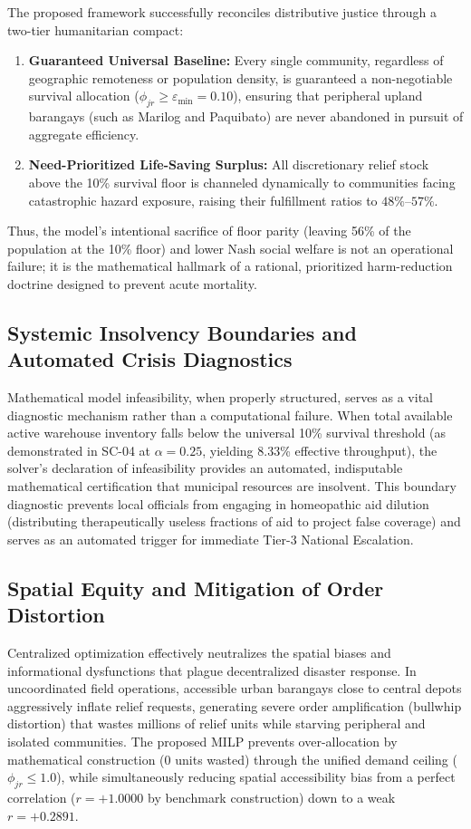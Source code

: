 The proposed framework successfully reconciles distributive justice through a two-tier humanitarian compact:
\begin{enumerate}
    \item \textbf{Guaranteed Universal Baseline:} Every single community, regardless of geographic remoteness or population density, is guaranteed a non-negotiable survival allocation ($\phi_{jr} \ge \varepsilon_{\min} = 0.10$), ensuring that peripheral upland barangays (such as Marilog and Paquibato) are never abandoned in pursuit of aggregate efficiency.
    \item \textbf{Need-Prioritized Life-Saving Surplus:} All discretionary relief stock above the 10\% survival floor is channeled dynamically to communities facing catastrophic hazard exposure, raising their fulfillment ratios to $48\%$--$57\%$.
\end{enumerate}
Thus, the model's intentional sacrifice of floor parity (leaving 56\% of the population at the 10\% floor) and lower Nash social welfare is not an operational failure; it is the mathematical hallmark of a rational, prioritized harm-reduction doctrine designed to prevent acute mortality.

\subsection{Systemic Insolvency Boundaries and Automated Crisis Diagnostics}
Mathematical model infeasibility, when properly structured, serves as a vital diagnostic mechanism rather than a computational failure. When total available active warehouse inventory falls below the universal 10\% survival threshold (as demonstrated in SC-04 at $\alpha = 0.25$, yielding 8.33\% effective throughput), the solver's declaration of infeasibility provides an automated, indisputable mathematical certification that municipal resources are insolvent. This boundary diagnostic prevents local officials from engaging in homeopathic aid dilution (distributing therapeutically useless fractions of aid to project false coverage) and serves as an automated trigger for immediate Tier-3 National Escalation.

\subsection{Spatial Equity and Mitigation of Order Distortion}
Centralized optimization effectively neutralizes the spatial biases and informational dysfunctions that plague decentralized disaster response. In uncoordinated field operations, accessible urban barangays close to central depots aggressively inflate relief requests, generating severe order amplification (bullwhip distortion) that wastes millions of relief units while starving peripheral and isolated communities. The proposed MILP prevents over-allocation by mathematical construction ($0$ units wasted) through the unified demand ceiling ($\phi_{jr} \le 1.0$), while simultaneously reducing spatial accessibility bias from a perfect correlation ($r = +1.0000$ by benchmark construction) down to a weak $r = +0.2891$.



